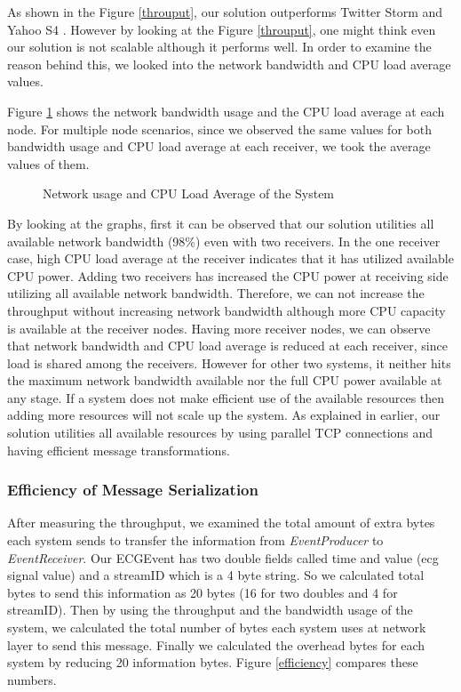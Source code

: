 As shown in the Figure \ref{throuput}, our solution outperforms Twitter Storm \cite{twitterStorm} and Yahoo S4 \cite{neumeyer2010s4}. However by looking at the Figure \ref{throuput}, one might think even our solution is not scalable although it performs well. In order to examine the reason behind this, we looked into the network bandwidth and CPU load average values. 
 
Figure \ref{networkandload} shows the network bandwidth usage and the CPU load average at each node. For multiple node scenarios, since we observed the same values for both bandwidth usage and CPU load average at each receiver, we took the average values of them. 

\begin{figure}[!t]
	\centering
	\caption{Network usage and CPU Load Average of the System}
	\label{networkandload}
\end{figure}
 

By looking at the graphs, first it can be observed that our solution utilities all available network bandwidth (98\%) even with two receivers. In the one receiver case, high CPU load average at the receiver indicates that it has utilized available CPU power. Adding two receivers has increased the CPU power at receiving side utilizing all available network bandwidth. Therefore, we can not increase the throughput without increasing network bandwidth although more CPU capacity is available at the receiver nodes. Having more receiver nodes, we can observe that network bandwidth and CPU load average is reduced at each receiver, since load is shared among the receivers. However for other two systems, it neither hits the maximum network bandwidth available nor the full CPU power available at any stage. If a system does not make efficient use of the available resources then adding more resources will not scale up the system. As explained in earlier, our solution utilities all available resources by using parallel TCP connections and having efficient message transformations.

\subsubsection{Efficiency of Message Serialization}
After measuring the throughput, we examined the  total amount of extra bytes each system sends to transfer the information from \textit{EventProducer} to \textit{EventReceiver}. Our ECGEvent has two double fields called time and value (ecg signal value) and a streamID which is a 4 byte string. So we calculated total bytes to send this information as 20 bytes (16 for two doubles and 4 for streamID). Then by using the throughput and the bandwidth usage of the system, we calculated the total number of bytes each system uses at network layer to send this message. Finally we calculated the overhead bytes for each system by reducing 20 information bytes. Figure \ref{efficiency} compares these numbers.

